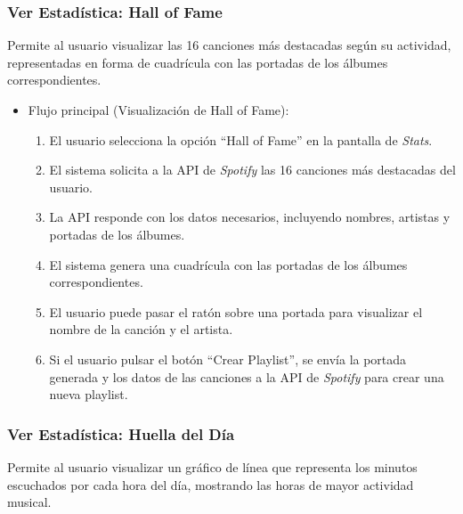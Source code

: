 \subsubsection*{Ver Estadística: Hall of Fame}

Permite al usuario visualizar las 16 canciones más destacadas según su actividad, representadas en forma de cuadrícula con las portadas de los álbumes correspondientes.

\begin{itemize}
    \item Flujo principal (Visualización de Hall of Fame):
          \begin{enumerate}
              \item El usuario selecciona la opción ``Hall of Fame'' en la pantalla de \textit{Stats}.
              \item El sistema solicita a la API de \textit{Spotify} las 16 canciones más destacadas del usuario.
              \item La API responde con los datos necesarios, incluyendo nombres, artistas y portadas de los álbumes.
              \item El sistema genera una cuadrícula con las portadas de los álbumes correspondientes.
              \item El usuario puede pasar el ratón sobre una portada para visualizar el nombre de la canción y el artista.
              \item Si el usuario pulsar el botón ``Crear Playlist'', se envía la portada generada y los datos de las canciones a la API de \textit{Spotify} para crear una nueva playlist.
          \end{enumerate}
\end{itemize}

\subsubsection*{Ver Estadística: Huella del Día}

Permite al usuario visualizar un gráfico de línea que representa los minutos escuchados por cada hora del día, mostrando las horas de mayor actividad musical.

